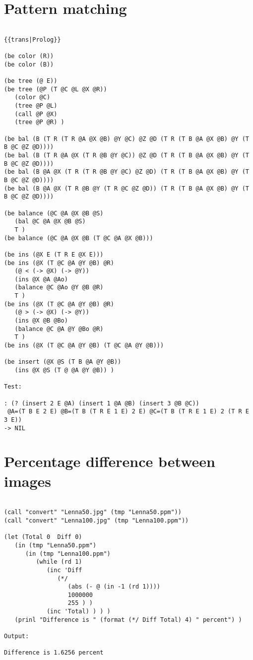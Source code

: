 \section*{Pattern matching}

\begin{verbatim}

{{trans|Prolog}}

(be color (R))
(be color (B))

(be tree (@ E))
(be tree (@P (T @C @L @X @R))
   (color @C)
   (tree @P @L)
   (call @P @X)
   (tree @P @R) )

(be bal (B (T R (T R @A @X @B) @Y @C) @Z @D (T R (T B @A @X @B) @Y (T B @C @Z @D))))
(be bal (B (T R @A @X (T R @B @Y @C)) @Z @D (T R (T B @A @X @B) @Y (T B @C @Z @D))))
(be bal (B @A @X (T R (T R @B @Y @C) @Z @D) (T R (T B @A @X @B) @Y (T B @C @Z @D))))
(be bal (B @A @X (T R @B @Y (T R @C @Z @D)) (T R (T B @A @X @B) @Y (T B @C @Z @D))))

(be balance (@C @A @X @B @S)
   (bal @C @A @X @B @S)
   T )
(be balance (@C @A @X @B (T @C @A @X @B)))

(be ins (@X E (T R E @X E)))
(be ins (@X (T @C @A @Y @B) @R)
   (@ < (-> @X) (-> @Y))
   (ins @X @A @Ao)
   (balance @C @Ao @Y @B @R)
   T )
(be ins (@X (T @C @A @Y @B) @R)
   (@ > (-> @X) (-> @Y))
   (ins @X @B @Bo)
   (balance @C @A @Y @Bo @R)
   T )
(be ins (@X (T @C @A @Y @B) (T @C @A @Y @B)))

(be insert (@X @S (T B @A @Y @B))
   (ins @X @S (T @ @A @Y @B)) )

Test:

: (? (insert 2 E @A) (insert 1 @A @B) (insert 3 @B @C))
 @A=(T B E 2 E) @B=(T B (T R E 1 E) 2 E) @C=(T B (T R E 1 E) 2 (T R E 3 E))
-> NIL

\end{verbatim}

\section*{Percentage difference between images}

\begin{verbatim}

(call "convert" "Lenna50.jpg" (tmp "Lenna50.ppm"))
(call "convert" "Lenna100.jpg" (tmp "Lenna100.ppm"))

(let (Total 0  Diff 0)
   (in (tmp "Lenna50.ppm")
      (in (tmp "Lenna100.ppm")
         (while (rd 1)
            (inc 'Diff
               (*/
                  (abs (- @ (in -1 (rd 1))))
                  1000000
                  255 ) )
            (inc 'Total) ) ) )
   (prinl "Difference is " (format (*/ Diff Total) 4) " percent") )

Output:

Difference is 1.6256 percent

\end{verbatim}

